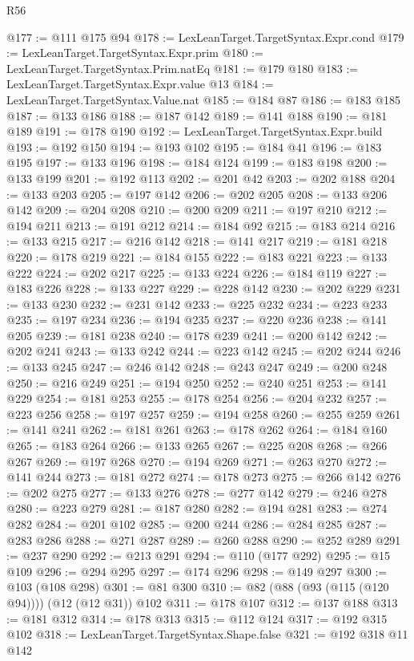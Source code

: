 \begin{lexlean}{R56}
\begin{coremodule}
@177 := @111 @175 @94
@178 := LexLeanTarget.TargetSyntax.Expr.cond
@179 := LexLeanTarget.TargetSyntax.Expr.prim
@180 := LexLeanTarget.TargetSyntax.Prim.natEq
@181 := @179 @180
@183 := LexLeanTarget.TargetSyntax.Expr.value @13
@184 := LexLeanTarget.TargetSyntax.Value.nat
@185 := @184 @87
@186 := @183 @185
@187 := @133 @186
@188 := @187 @142
@189 := @141 @188
@190 := @181 @189
@191 := @178 @190
@192 := LexLeanTarget.TargetSyntax.Expr.build
@193 := @192 @150
@194 := @193 @102
@195 := @184 @41
@196 := @183 @195
@197 := @133 @196
@198 := @184 @124
@199 := @183 @198
@200 := @133 @199
@201 := @192 @113
@202 := @201 @42
@203 := @202 @188
@204 := @133 @203
@205 := @197 @142
@206 := @202 @205
@208 := @133 @206 @142
@209 := @204 @208
@210 := @200 @209
@211 := @197 @210
@212 := @194 @211
@213 := @191 @212
@214 := @184 @92
@215 := @183 @214
@216 := @133 @215
@217 := @216 @142
@218 := @141 @217
@219 := @181 @218
@220 := @178 @219
@221 := @184 @155
@222 := @183 @221
@223 := @133 @222
@224 := @202 @217
@225 := @133 @224
@226 := @184 @119
@227 := @183 @226
@228 := @133 @227
@229 := @228 @142
@230 := @202 @229
@231 := @133 @230
@232 := @231 @142
@233 := @225 @232
@234 := @223 @233
@235 := @197 @234
@236 := @194 @235
@237 := @220 @236
@238 := @141 @205
@239 := @181 @238
@240 := @178 @239
@241 := @200 @142
@242 := @202 @241
@243 := @133 @242
@244 := @223 @142
@245 := @202 @244
@246 := @133 @245
@247 := @246 @142
@248 := @243 @247
@249 := @200 @248
@250 := @216 @249
@251 := @194 @250
@252 := @240 @251
@253 := @141 @229
@254 := @181 @253
@255 := @178 @254
@256 := @204 @232
@257 := @223 @256
@258 := @197 @257
@259 := @194 @258
@260 := @255 @259
@261 := @141 @241
@262 := @181 @261
@263 := @178 @262
@264 := @184 @160
@265 := @183 @264
@266 := @133 @265
@267 := @225 @208
@268 := @266 @267
@269 := @197 @268
@270 := @194 @269
@271 := @263 @270
@272 := @141 @244
@273 := @181 @272
@274 := @178 @273
@275 := @266 @142
@276 := @202 @275
@277 := @133 @276
@278 := @277 @142
@279 := @246 @278
@280 := @223 @279
@281 := @187 @280
@282 := @194 @281
@283 := @274 @282
@284 := @201 @102
@285 := @200 @244
@286 := @284 @285
@287 := @283 @286
@288 := @271 @287
@289 := @260 @288
@290 := @252 @289
@291 := @237 @290
@292 := @213 @291
@294 := @110 (@177 @292)
@295 := @15 @109
@296 := @294 @295
@297 := @174 @296
@298 := @149 @297
@300 := @103 (@108 @298)
@301 := @81 @300
@310 := @82 (@88 (@93 (@115 (@120 @94)))) (@12 (@12 @31)) @102
@311 := @178 @107
@312 := @137 @188
@313 := @181 @312
@314 := @178 @313
@315 := @112 @124
@317 := @192 @315 @102
@318 := LexLeanTarget.TargetSyntax.Shape.false
@321 := @192 @318 @11 @142

\end{coremodule}
\end{lexlean}
